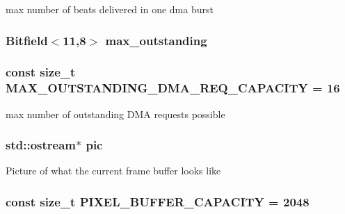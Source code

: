 \label{classHDLcd_aace62e6eea905bd83b1d848acf8e39c9}
max number of beats delivered in one dma burst \hypertarget{classHDLcd_a5f39b2e7351f4500ef1eb5babcb10381}{
\subsubsection[{max\_\-outstanding}]{\setlength{\rightskip}{0pt plus 5cm}Bitfield$<$11,8$>$ {\bf max\_\-outstanding}}}
\label{classHDLcd_a5f39b2e7351f4500ef1eb5babcb10381}
\hypertarget{classHDLcd_a5f08b80b40d4315ead7617e660bab910}{
\subsubsection[{MAX\_\-OUTSTANDING\_\-DMA\_\-REQ\_\-CAPACITY}]{\setlength{\rightskip}{0pt plus 5cm}const size\_\-t {\bf MAX\_\-OUTSTANDING\_\-DMA\_\-REQ\_\-CAPACITY} = 16}}
\label{classHDLcd_a5f08b80b40d4315ead7617e660bab910}
max number of outstanding DMA requests possible \hypertarget{classHDLcd_a7a229a4786deeddd59c6091247a8c8a6}{
\subsubsection[{offset}]{}}
\label{classHDLcd_a7a229a4786deeddd59c6091247a8c8a6}
\hypertarget{classHDLcd_af724472dcdfb49ce72ef865c101a1c0d}{
\subsubsection[{pic}]{\setlength{\rightskip}{0pt plus 5cm}std::ostream$\ast$ {\bf pic}}}
\label{classHDLcd_af724472dcdfb49ce72ef865c101a1c0d}
Picture of what the current frame buffer looks like \hypertarget{classHDLcd_a43f658311547cdd328f725c29f629d43}{
\subsubsection[{PIXEL\_\-BUFFER\_\-CAPACITY}]{\setlength{\rightskip}{0pt plus 5cm}const size\_\-t {\bf PIXEL\_\-BUFFER\_\-CAPACITY} = 2048}}
